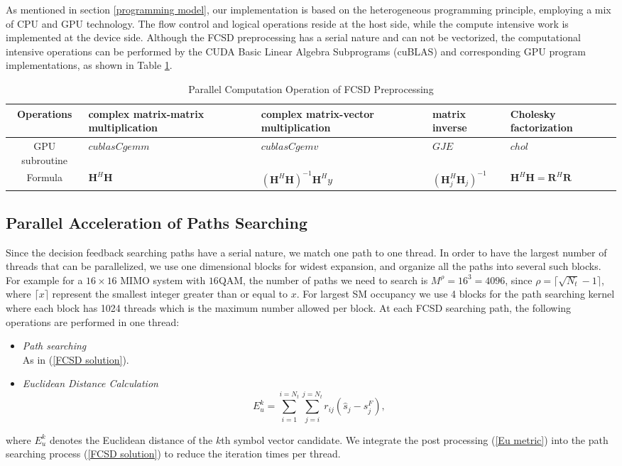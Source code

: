 \documentclass[letterpaper, 10pt, conference,twoside]{ieeeconf}
\begin{document}
As mentioned in section \ref{programming model}, our implementation is based on the heterogeneous programming principle, employing a mix of CPU and GPU technology. The flow control and logical operations reside at the host side, while the compute intensive work is implemented at the device side. Although the FCSD preprocessing has a serial nature and can not be vectorized, the computational intensive operations can be performed by the CUDA Basic Linear Algebra Subprograms (cuBLAS)\cite{nvidia2013basic} and corresponding GPU program implementations, as shown in Table \ref{table1}.
\begin{table}[htb]
\centering
\caption{Parallel Computation Operation of FCSD Preprocessing}
\begin{tabular}{|c|p{3cm}|p{3cm}|p{3cm}|p{3cm}|}
\hline
Operations & complex matrix-matrix multiplication & complex matrix-vector multiplication & matrix inverse & Cholesky factorization \\
\hline
GPU subroutine & $\mathit{cublasCgemm}$  & $\mathit{cublasCgemv}$ & $\mathit{GJE}$ & $\mathit{chol}$\\
\hline
Formula   &  $\mathbf{H}^{H}\mathbf{H}$ & $(\mathbf{H}^{H}\mathbf{H})^{-1}\mathbf{H}^{H}y$ & $(\mathbf{H}_{j}^{H}\mathbf{H}_{j})^{-1} $ & $\mathbf{H}^{H}\mathbf{H}=\mathbf{R}^{H}\mathbf{R}$ 
\\
\hline
\end{tabular}
\label{table1}
\end{table}

\subsection{Parallel Acceleration of Paths Searching}
Since the decision feedback searching paths have a serial nature, we match one path to one thread. In order to have the largest number of threads that can be parallelized, we use one dimensional blocks for widest expansion, and organize all the paths into several such blocks. For example for a $16\times 16$ MIMO system with $16$QAM, the number of paths we need to search is $M^{\rho}=16^{3}=4096$, since $\rho=\lceil \sqrt{N_{t}}-1\rceil$, where $\lceil x\rceil$ represent the smallest integer greater than or equal to $x$. For largest SM occupancy we use 4 blocks for the path searching kernel where each block has 1024 threads which is the maximum number allowed per block. At each FCSD searching path, the following operations are performed in one thread:
\begin{itemize}
\item \emph{Path searching}\\
As in (\ref{FCSD solution}).
\item \emph{Euclidean Distance Calculation}
\begin{equation}
E_{u}^{k}=\sum_{i=1}^{i=N_{t}}\sum_{j=i}^{j=N_{t}}r_{ij}(\hat{s}_{j}-s^{F}_{j}), \label{Eu metric}
\end{equation}
\end{itemize}
where $E_{u}^{k}$ denotes the Euclidean distance of the $k$th symbol vector candidate. We integrate the post processing (\ref{Eu metric}) into the path searching process (\ref{FCSD solution}) to reduce the iteration times per thread.
 
\end{document}
